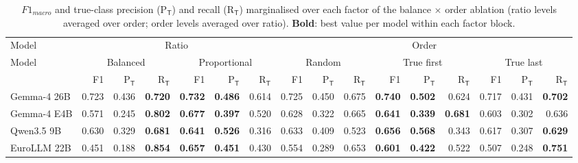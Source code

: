 \begin{table}[t]
\centering
\caption{$F1_{macro}$ and true-class precision (P$_\mathsf{T}$) and recall (R$_\mathsf{T}$) marginalised over each factor of the balance $\times$ order ablation (ratio levels averaged over order; order levels averaged over ratio). \textbf{Bold}: best value per model within each factor block.}
\label{tab:ablation-pr-marginal}
\small
\setlength{\tabcolsep}{4pt}
\begin{tabular}{lrrrrrrrrrrrrrrr}
\toprule
Model & \multicolumn{6}{c}{Ratio} & \multicolumn{9}{c}{Order} \\
\cmidrule(lr){2-7} \cmidrule(lr){8-16}
Model & \multicolumn{3}{c}{Balanced} & \multicolumn{3}{c}{Proportional} & \multicolumn{3}{c}{Random} & \multicolumn{3}{c}{True first} & \multicolumn{3}{c}{True last} \\
\cmidrule(lr){2-4} \cmidrule(lr){5-7} \cmidrule(lr){8-10} \cmidrule(lr){11-13} \cmidrule(lr){14-16}
 & F1 & P$_\mathsf{T}$ & R$_\mathsf{T}$ & F1 & P$_\mathsf{T}$ & R$_\mathsf{T}$ & F1 & P$_\mathsf{T}$ & R$_\mathsf{T}$ & F1 & P$_\mathsf{T}$ & R$_\mathsf{T}$ & F1 & P$_\mathsf{T}$ & R$_\mathsf{T}$ \\
\midrule
Gemma-4 26B & 0.723 & 0.436 & \textbf{0.720} & \textbf{0.732} & \textbf{0.486} & 0.614 & 0.725 & 0.450 & 0.675 & \textbf{0.740} & \textbf{0.502} & 0.624 & 0.717 & 0.431 & \textbf{0.702} \\
Gemma-4 E4B & 0.571 & 0.245 & \textbf{0.802} & \textbf{0.677} & \textbf{0.397} & 0.520 & 0.628 & 0.322 & 0.665 & \textbf{0.641} & \textbf{0.339} & \textbf{0.681} & 0.603 & 0.302 & 0.636 \\
Qwen3.5 9B & 0.630 & 0.329 & \textbf{0.681} & \textbf{0.641} & \textbf{0.526} & 0.316 & 0.633 & 0.409 & 0.523 & \textbf{0.656} & \textbf{0.568} & 0.343 & 0.617 & 0.307 & \textbf{0.629} \\
EuroLLM 22B & 0.451 & 0.188 & \textbf{0.854} & \textbf{0.657} & \textbf{0.451} & 0.430 & 0.554 & 0.289 & 0.653 & \textbf{0.601} & \textbf{0.422} & 0.522 & 0.507 & 0.248 & \textbf{0.751} \\
\bottomrule
\end{tabular}
\end{table}